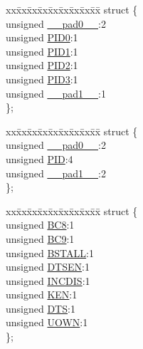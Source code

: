 \begin{DoxyCompactItemize}
\begin{tabbing}
\end{tabbing}\item 
\begin{tabbing}
xx\=xx\=xx\=xx\=xx\=xx\=xx\=xx\=xx\=\kill
struct \{\\
\>unsigned \hyperlink{union___b_d___s_t_a_t_adf71f3d8410c1f1dbbc96680a92c49af}{\_\_pad0\_\_}:2\\
\>unsigned \hyperlink{union___b_d___s_t_a_t_a810a2f6d15fc42c5d1e610b6e927d2eb}{PID0}:1\\
\>unsigned \hyperlink{union___b_d___s_t_a_t_acefd8c6eba334031c18cd877dfe08bfb}{PID1}:1\\
\>unsigned \hyperlink{union___b_d___s_t_a_t_aef3d6a9445a3c61d870212360c0a6110}{PID2}:1\\
\>unsigned \hyperlink{union___b_d___s_t_a_t_a771971768126aebea428ac7194b17fc0}{PID3}:1\\
\>unsigned \hyperlink{union___b_d___s_t_a_t_acaf2d0924a107ec6e8d2e31febaf66f9}{\_\_pad1\_\_}:1\\
\}; \\

\end{tabbing}\item 
\begin{tabbing}
xx\=xx\=xx\=xx\=xx\=xx\=xx\=xx\=xx\=\kill
struct \{\\
\>unsigned \hyperlink{union___b_d___s_t_a_t_adf71f3d8410c1f1dbbc96680a92c49af}{\_\_pad0\_\_}:2\\
\>unsigned \hyperlink{union___b_d___s_t_a_t_a97b41b25e06fd7857dcc6217c160a8ad}{PID}:4\\
\>unsigned \hyperlink{union___b_d___s_t_a_t_acaf2d0924a107ec6e8d2e31febaf66f9}{\_\_pad1\_\_}:2\\
\}; \\

\end{tabbing}\item 
\begin{tabbing}
xx\=xx\=xx\=xx\=xx\=xx\=xx\=xx\=xx\=\kill
struct \{\\
\>unsigned \hyperlink{union___b_d___s_t_a_t_a5d5010d284e6c86702a4ce3063f4cca5}{BC8}:1\\
\>unsigned \hyperlink{union___b_d___s_t_a_t_af499c0fe1fd8eba827eb024bf69841e9}{BC9}:1\\
\>unsigned \hyperlink{union___b_d___s_t_a_t_a145ee75f12c62d2a89097d18477019f2}{BSTALL}:1\\
\>unsigned \hyperlink{union___b_d___s_t_a_t_adeff6f5de2d8ca0cfa956560288c3541}{DTSEN}:1\\
\>unsigned \hyperlink{union___b_d___s_t_a_t_a39604d4252cc3e5f9551bd2cd3b54584}{INCDIS}:1\\
\>unsigned \hyperlink{union___b_d___s_t_a_t_aaf39e9ac8929e7da9cb427f1b0de0934}{KEN}:1\\
\>unsigned \hyperlink{union___b_d___s_t_a_t_a74db087bfe32cd33c459191f7a4aeb13}{DTS}:1\\
\>unsigned \hyperlink{union___b_d___s_t_a_t_abc982c28d59f8e36dbcb06639010169d}{UOWN}:1\\
\}; \\


\end{tabbing}
\end{DoxyCompactItemize}

